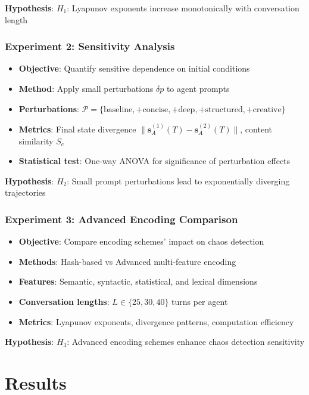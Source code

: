 \documentclass[11pt,a4paper]{article}
\begin{document}
\textbf{Hypothesis}: $H_1$: Lyapunov exponents increase monotonically with conversation length

\subsubsection{Experiment 2: Sensitivity Analysis}
\begin{itemize}
    \item \textbf{Objective}: Quantify sensitive dependence on initial conditions
    \item \textbf{Method}: Apply small perturbations $\delta p$ to agent prompts
    \item \textbf{Perturbations}: $\mathcal{P} = \{\text{baseline}, +\text{concise}, +\text{deep}, +\text{structured}, +\text{creative}\}$
    \item \textbf{Metrics}: Final state divergence $\|\mathbf{s}_A^{(1)}(T) - \mathbf{s}_A^{(2)}(T)\|$, content similarity $S_c$
    \item \textbf{Statistical test}: One-way ANOVA for significance of perturbation effects
\end{itemize}

\textbf{Hypothesis}: $H_2$: Small prompt perturbations lead to exponentially diverging trajectories

\subsubsection{Experiment 3: Advanced Encoding Comparison}
\begin{itemize}
    \item \textbf{Objective}: Compare encoding schemes' impact on chaos detection
    \item \textbf{Methods}: Hash-based vs Advanced multi-feature encoding
    \item \textbf{Features}: Semantic, syntactic, statistical, and lexical dimensions
    \item \textbf{Conversation lengths}: $L \in \{25, 30, 40\}$ turns per agent
    \item \textbf{Metrics}: Lyapunov exponents, divergence patterns, computation efficiency
\end{itemize}

\textbf{Hypothesis}: $H_3$: Advanced encoding schemes enhance chaos detection sensitivity

\section{Results}
\end{document}
